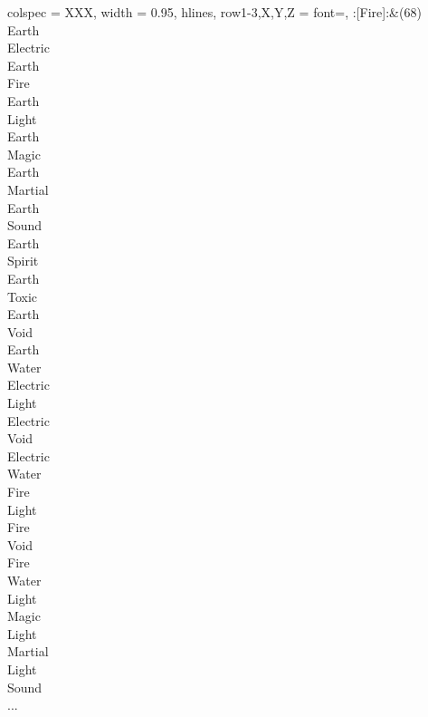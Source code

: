 \begin{longtblr}[
	caption = {2v1 Defending Resisted},
	label = {2v1-Defending-Resisted},
]{
	colspec = {XXX}, width = 0.95\linewidth,
	hlines,
	row{1-3,X,Y,Z} = {font=\bfseries},
}
	:[Fire]:&{(68)\\
	Earth \\
	Electric \\
	Earth \\
	Fire \\
	Earth \\
	Light \\
	Earth \\
	Magic \\
	Earth \\
	Martial \\
	Earth \\
	Sound \\
	Earth \\
	Spirit \\
	Earth \\
	Toxic \\
	Earth \\
	Void \\
	Earth \\
	Water \\
	Electric \\
	Light \\
	Electric \\
	Void \\
	Electric \\
	Water \\
	Fire \\
	Light \\
	Fire \\
	Void \\
	Fire \\
	Water \\
	Light \\
	Magic \\
	Light \\
	Martial \\
	Light \\
	Sound \\
	...\\
	}\\


\end{longtblr}
